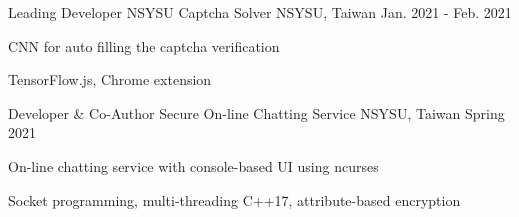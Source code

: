 \begin{cventries}

  \cventry
    {Leading Developer} %
    {NSYSU Captcha Solver} %
    {NSYSU, Taiwan} %
    {Jan. 2021 - Feb. 2021} %
    {
      \begin{cvitems} %
        \item {CNN for auto filling the captcha verification}
        \item {TensorFlow.js, Chrome extension
        \hspace*{\fill}
        \href{https://github.com/ernestchu/nsysu-captcha-solver}{\faGithub}
        }
      \end{cvitems}
    }

  \cventry
    {Developer \& Co-Author} %
    {Secure On-line Chatting Service} %
    {NSYSU, Taiwan} %
    {Spring 2021} %
    {
      \begin{cvitems} %
        \item {On-line chatting service with console-based UI using ncurses}
        \item {Socket programming, multi-threading C++17, attribute-based encryption
        \hspace*{\fill}
        \href{https://youtu.be/S-j5kQz\_-7Y}{\faVideoCamera}
        \href{https://ernestchu.github.io/abe-examples/paper.pdf}{\faFilePdfO}
        \href{https://github.com/ernestchu/on-line-chatting-service/tree/abe}{\faGithub}
        }
      \end{cvitems}
    }


\end{cventries}
